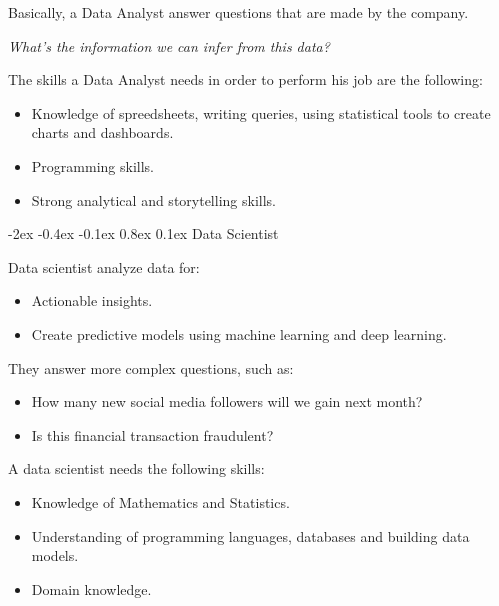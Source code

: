 \documentclass[12pt]{report}
\makeatletter
\renewcommand{\subsection}{\@startsection{subsection}{2}{\z@}%
  {-2ex \@plus -0.4ex \@minus -0.1ex}%
  {0.8ex \@plus 0.1ex}%
  {\normalfont\large\subsectionstyle}}
\newcommand{\subsectionstyle}[1]{%
  \par\noindent\hrule
  \vspace{-0.4ex}%
  {\scshape #1\par}%
  \vspace{0.4ex}%
  \hrule
}
\theoremstyle{largebreak}
\makeatother
\begin{document}
    Basically, a Data Analyst answer questions that are made by the company.

    \begin{center}
        \textit{What's the information we can infer from this data?}
    \end{center}

    \begin{obs}
        The skills a Data Analyst needs in order to perform his job are the following:
        \begin{itemize}
            \item Knowledge of spreedsheets, writing queries, using statistical tools to create charts and dashboards.
            \item Programming skills.
            \item Strong analytical and storytelling skills.
        \end{itemize}
    \end{obs}

    \subsection{Data Scientist}
    
    Data scientist analyze data for:
    \begin{itemize}
        \item Actionable insights.
        \item Create predictive models using machine learning and deep learning.
    \end{itemize}

    They answer more complex questions, such as:
    \begin{itemize}
        \item How many new social media followers will we gain next month?
        \item Is this financial transaction fraudulent?
    \end{itemize}

    A data scientist needs the following skills:
    \begin{itemize}
        \item Knowledge of Mathematics and Statistics.
        \item Understanding of programming languages, databases and building data models.
        \item Domain knowledge.
    \end{itemize}
\end{document}
